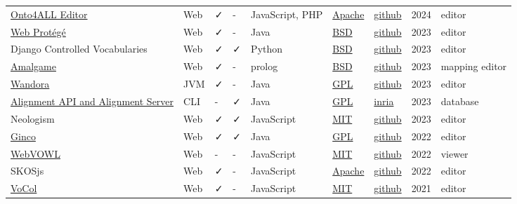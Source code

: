\documentclass[
  DIV=10]{article}
\begin{document}
\begin{longtable}[]{@{}lllllllll@{}}
\href{https://onto4all.com/}{Onto4ALL Editor} & Web & ✓ & - &
JavaScript, PHP & \href{https://spdx.org/licenses/Apache-2.0}{Apache} &
\href{https://github.com/NCOR-BR/onto4all}{github} & 2024 & editor \\
\href{https://protegewiki.stanford.edu/wiki/WebProtege}{Web Protégé} &
Web & ✓ & - & Java & \href{https://spdx.org/licenses/BSD-3-Clause}{BSD}
& \href{https://github.com/protegeproject/webprotege}{github} & 2023 &
editor \\
Django Controlled Vocabularies & Web & ✓ & ✓ & Python &
\href{https://spdx.org/licenses/BSD-3-Clause}{BSD} &
\href{https://github.com/unt-libraries/django-controlled-vocabularies}{github}
& 2023 & editor \\
\href{https://semanticweb.cs.vu.nl/amalgame/}{Amalgame} & Web & ✓ & - &
prolog & \href{https://spdx.org/licenses/BSD-3-Clause}{BSD} &
\href{https://github.com/jrvosse/amalgame}{github} & 2023 & mapping
editor \\
\href{http://wandora.org/www/}{Wandora} & JVM & ✓ & - & Java &
\href{https://spdx.org/licenses/GPL-3.0-or-later}{GPL} &
\href{https://github.com/wandora-team/wandora}{github} & 2023 &
editor \\
\href{https://moex.gitlabpages.inria.fr/alignapi/}{Alignment API and
Alignment Server} & CLI & - & ✓ & Java &
\href{https://spdx.org/licenses/GPL-3.0-or-later}{GPL} &
\href{https://gitlab.inria.fr/moex/alignapi/}{inria} & 2023 &
database \\
Neologism & Web & ✓ & ✓ & JavaScript &
\href{https://spdx.org/licenses/MIT}{MIT} &
\href{https://github.com/Semantic-Society/Neologism}{github} & 2023 &
editor \\
\href{http://culturecommunication.github.io/ginco/}{Ginco} & Web & ✓ & ✓
& Java & \href{https://spdx.org/licenses/GPL-3.0-or-later}{GPL} &
\href{https://github.com/culturecommunication/ginco}{github} & 2022 &
editor \\
\href{https://service.tib.eu/webvowl/}{WebVOWL} & Web & - & - &
JavaScript & \href{https://spdx.org/licenses/MIT}{MIT} &
\href{https://github.com/VisualDataWeb/WebVOWL}{github} & 2022 &
viewer \\
SKOSjs & Web & ✓ & - & JavaScript &
\href{https://spdx.org/licenses/Apache-2.0}{Apache} &
\href{https://github.com/tkurz/skosjs}{github} & 2022 & editor \\
\href{https://www.vocoreg.com/}{VoCol} & Web & ✓ & - & JavaScript &
\href{https://spdx.org/licenses/MIT}{MIT} &
\href{https://github.com/vocol/vocol}{github} & 2021 & editor \\

\end{longtable}
\end{document}
